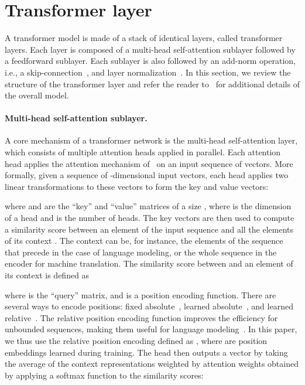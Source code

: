\documentclass{article}
\begin{document}
\section{Transformer layer}
A transformer model is made of a stack of identical layers, called transformer layers.
Each layer is composed of a multi-head self-attention sublayer followed by a feedforward sublayer.
Each sublayer is also followed by an add-norm operation, i.e., a skip-connection~\cite{he2016deep}, and layer normalization~\cite{ba2016layer}.
In this section, we review the structure of the transformer layer and refer the reader to~\citet{vaswani2017attention} for additional details of the overall model.

\paragraph{Multi-head self-attention sublayer.}
A core mechanism of a transformer network is the multi-head self-attention layer, which consists of multiple attention heads applied in parallel.
Each attention head applies the attention mechanism of~\citet{bahdanau2014neural} on an input sequence of vectors.
More formally, given a sequence  of -dimensional input vectors, each head applies two linear transformations to these vectors to form the key and value vectors:

where  and  are the ``key'' and ``value'' matrices of a size , where  is the dimension of a head and  is the number of heads.
The key vectors are then used to compute a similarity score between an element  of the input sequence and all the elements of its context .
The context can be, for instance, the elements of the sequence that precede  in the case of language modeling, or the whole sequence in the encoder for machine translation.
The similarity score between  and an element  of its context  is defined as

where  is the ``query'' matrix, and  is a position encoding function.
There are several ways to encode positions: fixed absolute~\citep{vaswani2017attention}, learned absolute~\citep{al2018character}, and learned relative~\citep{sukhbaatar2015end,shaw2018self}.
The relative position encoding function improves the efficiency for unbounded sequences, making them useful for language modeling~\cite{dai2019transformer}.
In this paper, we thus use the relative position encoding defined as , where  are position embeddings learned during training.
The head then outputs a vector  by taking the average of the context representations weighted by attention weights  obtained by applying a softmax function to the similarity scores:
\end{document}
